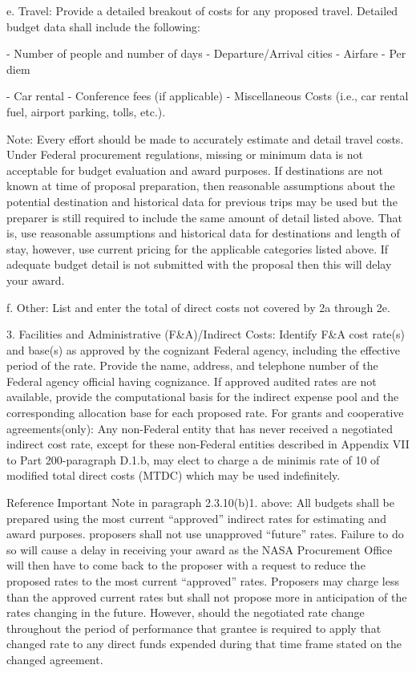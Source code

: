 \documentclass[12pt]{article}
\begin{document}
e. Travel: Provide a detailed breakout of costs for any proposed
travel. Detailed budget data shall include the following:

- Number of people and number of days - Departure/Arrival cities -
  Airfare - Per diem

- Car rental - Conference fees (if applicable) - Miscellaneous Costs
  (i.e., car rental fuel, airport parking, tolls, etc.).

Note: Every effort should be made to accurately estimate and detail
travel costs. Under Federal procurement regulations, missing or
minimum data is not acceptable for budget evaluation and award
purposes. If destinations are not known at time of proposal
preparation, then reasonable assumptions about the potential
destination and historical data for previous trips may be used but the
preparer is still required to include the same amount of detail listed
above. That is, use reasonable assumptions and historical data for
destinations and length of stay, however, use current pricing for the
applicable categories listed above. If adequate budget detail is not
submitted with the proposal then this will delay your award.

f. Other: List and enter the total of direct costs not covered by 2a
through 2e.



3. Facilities and Administrative (F\&A)/Indirect Costs: Identify F\&A
   cost rate(s) and base(s) as approved by the cognizant Federal
   agency, including the effective period of the rate. Provide the
   name, address, and telephone number of the Federal agency official
   having cognizance. If approved audited rates are not available,
   provide the computational basis for the indirect expense pool and
   the corresponding allocation base for each proposed rate. For
   grants and cooperative agreements(only): Any non-Federal entity
   that has never received a negotiated indirect cost rate, except for
   these non-Federal entities described in Appendix VII to Part
   200-paragraph D.1.b, may elect to charge a de minimis rate of 10%
   of modified total direct costs (MTDC) which may be used
   indefinitely.

Reference Important Note in paragraph 2.3.10(b)1. above: All budgets
shall be prepared using the most current ``approved'' indirect rates for
estimating and award purposes. proposers shall not use unapproved
``future'' rates. Failure to do so will cause a delay in receiving your
award as the NASA Procurement Office will then have to come back to
the proposer with a request to reduce the proposed rates to the most
current ``approved'' rates. Proposers may charge less than the approved
current rates but shall not propose more in anticipation of the rates
changing in the future. However, should the negotiated rate change
throughout the period of performance that grantee is required to apply
that changed rate to any direct funds expended during that time frame
stated on the changed agreement.
\end{document}
